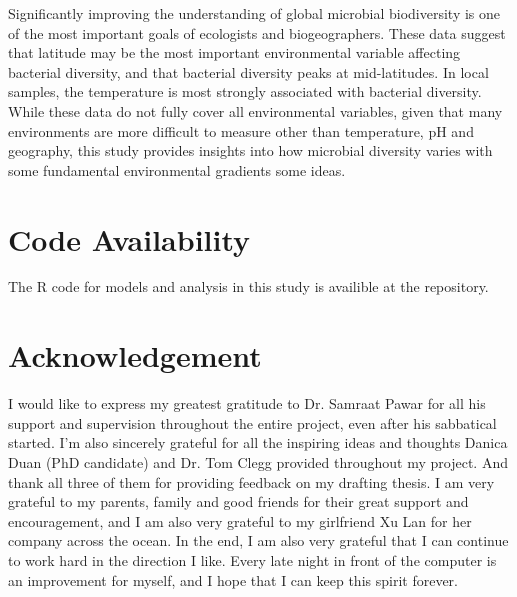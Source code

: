 \documentclass[11pt, a4paper]{article}
\begin{document}
\begin{spacing}{1.5}
Significantly improving the understanding of global microbial biodiversity is one of the most important goals of ecologists and biogeographers. These data suggest that latitude may be the most important environmental variable affecting bacterial diversity, and that bacterial diversity peaks at mid-latitudes. In local samples, the temperature is most strongly associated with bacterial diversity. While these data do not fully cover all environmental variables, given that many environments are more difficult to measure other than temperature, pH and geography, this study provides insights into how microbial diversity varies with some fundamental environmental gradients some ideas.

\section*{Code Availability}

The R code for models and analysis in this study is availible at the \href{https://github.com/ChuxuanJi/EECProject1}{} repository.

\section*{Acknowledgement}

I would like to express my greatest gratitude to Dr. Samraat Pawar for all his support and supervision throughout the entire project, even after his sabbatical started. I'm also sincerely grateful for all the inspiring ideas and thoughts Danica Duan (PhD candidate) and Dr. Tom Clegg provided throughout my project. And thank all three of them for providing feedback on my drafting thesis. I am very grateful to my parents, family and good friends for their great support and encouragement, and I am also very grateful to my girlfriend Xu Lan for her company across the ocean. In the end, I am also very grateful that I can continue to work hard in the direction I like. Every late night in front of the computer is an improvement for myself, and I hope that I can keep this spirit forever. 



\clearpage



\end{spacing}
\end{document}
